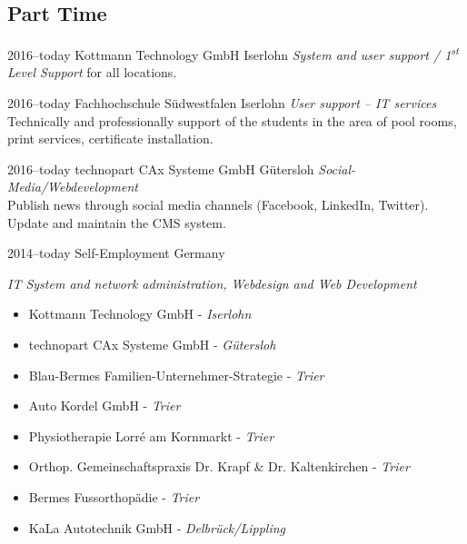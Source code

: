 \documentclass[]{friggeri-cv} %
\begin{document}
\subsection{Part Time}

\begin{entrylist}

\entry
{2016--today}
{Kottmann Technology GmbH}
{Iserlohn}
{\emph{System and user support / 1\textsuperscript{st} Level Support} for all locations.}


\entry
{2016--today}
{Fachhochschule Südwestfalen}
{Iserlohn}
{\emph{User support – IT services} \\
Technically and professionally support of the students in the area of pool rooms, print services, certificate installation.}


\entry
{2016--today}
{technopart CAx Systeme GmbH}
{Gütersloh}
{\emph{Social-Media/Webdevelopment} \\
Publish news through social media channels (Facebook, LinkedIn, Twitter). \\Update and maintain the CMS system.}


\entry
{2014--today}
{Self-Employment}
{Germany}
{\emph{IT System and network administration, Webdesign and Web Development}
\begin{itemize}
\item Kottmann Technology GmbH - \textit{Iserlohn}
\item technopart CAx Systeme GmbH - \textit{Gütersloh}
\item Blau-Bermes Familien-Unternehmer-Strategie - \textit{Trier}
\item Auto Kordel GmbH - \textit{Trier}
\item Physiotherapie Lorré am Kornmarkt - \textit{Trier}
\item Orthop. Gemeinschaftspraxis Dr. Krapf \& Dr. Kaltenkirchen - \textit{Trier}
\item Bermes Fussorthopädie - \textit{Trier}
\item KaLa Autotechnik GmbH - \textit{Delbrück/Lippling} \\
\end{itemize}
}



\end{entrylist}
\end{document}
